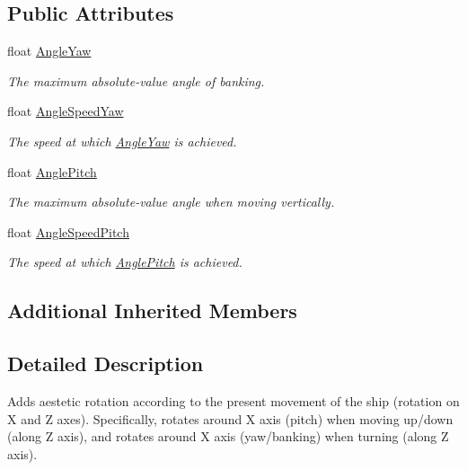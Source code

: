 \subsection*{Public Attributes}
\begin{DoxyCompactItemize}
\item 
float \hyperlink{class_skyrates_1_1_a_i_1_1_custom_1_1_ship_rotation_abcda42fd1d33d8189aadb283d3ba248c}{Angle\-Yaw}
\begin{DoxyCompactList}\small\item\em The maximum absolute-\/value angle of banking. \end{DoxyCompactList}\item 
float \hyperlink{class_skyrates_1_1_a_i_1_1_custom_1_1_ship_rotation_a35320a27fe52da777b3cf343f2b879b2}{Angle\-Speed\-Yaw}
\begin{DoxyCompactList}\small\item\em The speed at which \hyperlink{class_skyrates_1_1_a_i_1_1_custom_1_1_ship_rotation_abcda42fd1d33d8189aadb283d3ba248c}{Angle\-Yaw} is achieved. \end{DoxyCompactList}\item 
float \hyperlink{class_skyrates_1_1_a_i_1_1_custom_1_1_ship_rotation_a3c427f9a37774bca1736f3f74db91f89}{Angle\-Pitch}
\begin{DoxyCompactList}\small\item\em The maximum absolute-\/value angle when moving vertically. \end{DoxyCompactList}\item 
float \hyperlink{class_skyrates_1_1_a_i_1_1_custom_1_1_ship_rotation_af966fbfe16e1f411288a8681d99b2d08}{Angle\-Speed\-Pitch}
\begin{DoxyCompactList}\small\item\em The speed at which \hyperlink{class_skyrates_1_1_a_i_1_1_custom_1_1_ship_rotation_a3c427f9a37774bca1736f3f74db91f89}{Angle\-Pitch} is achieved. \end{DoxyCompactList}\end{DoxyCompactItemize}
\subsection*{Additional Inherited Members}


\subsection{Detailed Description}
Adds aestetic rotation according to the present movement of the ship (rotation on X and Z axes). Specifically, rotates around X axis (pitch) when moving up/down (along Z axis), and rotates around X axis (yaw/banking) when turning (along Z axis). 



